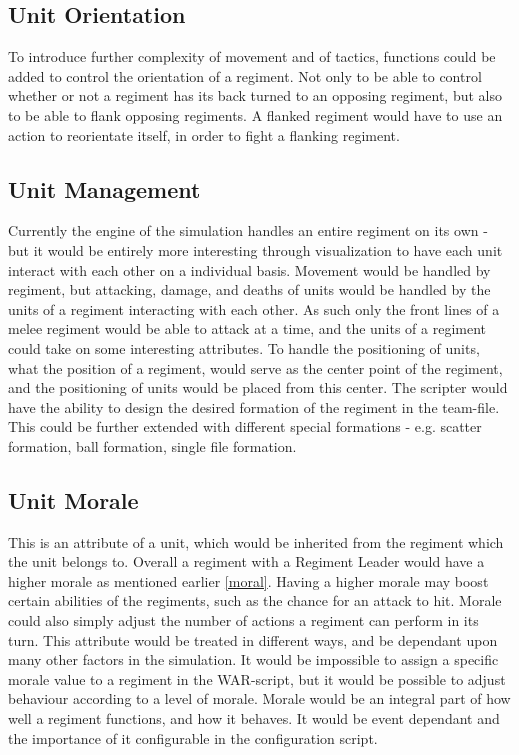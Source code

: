 \subsection{Unit Orientation}
To introduce further complexity of movement and of tactics, functions could be added to control the orientation of a regiment. Not only to be able to control whether or not a regiment has its back turned to an opposing regiment, but also to be able to flank opposing regiments. A flanked regiment would have to use an action to reorientate itself, in order to fight a flanking regiment.
\subsection{Unit Management}
Currently the engine of the simulation handles an entire regiment on its own - but it would be entirely more interesting through visualization to have each unit interact with each other on a individual basis. Movement would be handled by regiment, but attacking, damage, and deaths of units would be handled by the units of a regiment interacting with each other. As such only the front lines of a melee regiment would be able to attack at a time, and the units of a regiment could take on some interesting attributes. 
To handle the positioning of units, what the position of a regiment, would serve as the center point of the regiment, and the positioning of units would be placed from this center. The scripter would have the ability to design the desired formation of the regiment in the team-file. This could be further extended with different special formations - e.g. scatter formation, ball formation, single file formation.
\subsection{Unit Morale}
This is an attribute of a unit, which would be inherited from the regiment which the unit belongs to. Overall a regiment with a Regiment Leader would have a higher morale as mentioned earlier \ref{moral}. Having a higher morale may boost certain abilities of the regiments, such as the chance for an attack to hit. Morale could also simply adjust the number of actions a regiment can perform in its turn. This attribute would be treated in different ways, and be dependant upon many other factors in the simulation. It would be impossible to assign a specific morale value to a regiment in the WAR-script, but it would be possible to adjust behaviour according to a level of morale. Morale would be an integral part of how well a regiment functions, and how it behaves. It would be event dependant and the importance of it configurable in the configuration script. 
